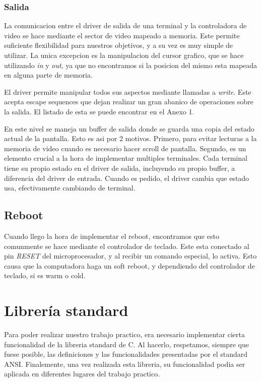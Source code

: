 \documentclass[a4paper,10pt]{article}
\begin{document}
        \subsubsection{Salida}
            La comunicacion entre el driver de salida de una terminal y la controladora de video se hace mediante el sector de video mapeado a memoria.
            Este permite suficiente flexibilidad para nuestros objetivos, y a su vez es muy simple de utilizar.
            La unica excepcion es la manipulacion del cursor grafico, que se hace utilizando \textit{in} y \textit{out}, ya que no encontramos si la posicion del mismo esta mapeada en alguna parte de memoria.

            El driver permite manipular todos sus aspectos mediante llamadas a \textit{write}.
            Este acepta escape sequences que dejan realizar un gran abanico de operaciones sobre la salida.
            El listado de esta se puede encontrar en el Anexo 1.
            
            En este nivel se maneja un buffer de salida donde se guarda una copia del estado actual de la pantalla.
            Esto es asi por 2 motivos.
            Primero, para evitar lecturas a la memoria de video cuando es necesario hacer scroll de pantalla.
            Segundo, es un elemento crucial a la hora de implementar multiples terminales.
            Cada terminal tiene su propio estado en el driver de salida, incluyendo su propio buffer, a diferencia del driver de entrada.
            Cuando es pedido, el driver cambia que estado usa, efectivamente cambiando de terminal.

    \subsection{Reboot} 
        Cuando llego la hora de implementar el reboot, encontramos que esto comunmente se hace mediante el controlador de teclado.
        Este esta conectado al pin \textit{RESET} del microprocesador, y al recibir un comando especial, lo activa.
        Esto causa que la computadora haga un soft reboot, y dependiendo del controlador de teclado, si es warm o cold.

\section{Librería standard}
    Para poder realizar nuestro trabajo practico, era necesario implementar cierta funcionalidad de la libreria standard de C. Al hacerlo, respetamos, siempre que fuese posible, las definiciones y las funcionalidades presentadas por el standard ANSI.
    Finalemente, una vez realizada esta libreria, su funcionalidad podia ser aplicada en diferentes lugares del trabajo practico.
\end{document}

